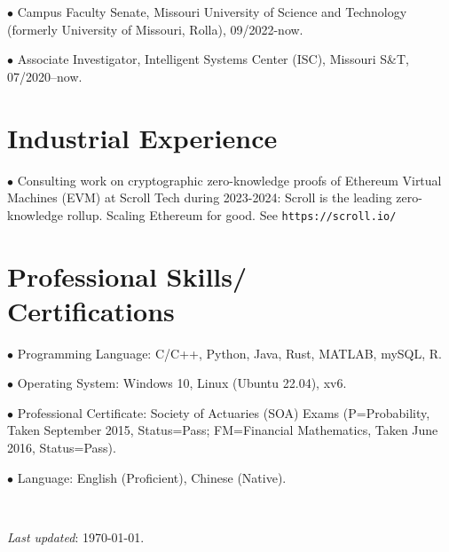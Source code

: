\documentclass[margin,line]{res}
\begin{document}
\begin{resume}
$\bullet$ Campus Faculty Senate, Missouri University
of Science and Technology (formerly University of Missouri, Rolla), 09/2022-now.

$\bullet$ Associate Investigator, Intelligent Systems Center (ISC), Missouri S\&T, 07/2020--now. 


\section{\sc Industrial Experience}

$\bullet$ Consulting work on cryptographic zero-knowledge proofs of Ethereum Virtual Machines (EVM) at Scroll Tech during 2023-2024: Scroll is the leading zero-knowledge rollup. Scaling Ethereum for good. See \verb#https://scroll.io/#


\section{\sc Professional Skills/ \\ Certifications}

$\bullet$ Programming Language: C/C++, Python, Java, Rust, MATLAB, mySQL, R. 

$\bullet$ Operating System: Windows 10, Linux (Ubuntu 
 22.04), xv6.

$\bullet$ Professional Certificate: Society of Actuaries (SOA) Exams
(P=Probability, Taken September 2015, Status=Pass; FM=Financial Mathematics, Taken
June 2016, Status=Pass).

$\bullet$ Language: English (Proficient), Chinese (Native).


\

\textit{Last updated}: \today.

\end{resume}
\end{document}
